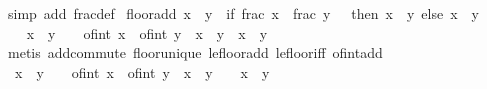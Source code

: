 \begin{isabellebody}
\isamarkupfalse%
\ {\isacharparenleft}{\kern0pt}simp\ add{\isacharcolon}{\kern0pt}\ frac{\isacharunderscore}{\kern0pt}def{\isacharparenright}{\kern0pt}%
\endisatagproof
{\isafoldproof}%
%
\isadelimproof
\isanewline
%
\endisadelimproof
\isanewline
{}\isamarkupfalse%
\ floor{\isacharunderscore}{\kern0pt}add{\isacharcolon}{\kern0pt}\ {\isachardoublequoteopen}{\isasymlfloor}x\ {\isacharplus}{\kern0pt}\ y{\isasymrfloor}\ {\isacharequal}{\kern0pt}\ {\isacharparenleft}{\kern0pt}if\ frac\ x\ {\isacharplus}{\kern0pt}\ frac\ y\ {\isacharless}{\kern0pt}\ {}\ then\ {\isasymlfloor}x{\isasymrfloor}\ {\isacharplus}{\kern0pt}\ {\isasymlfloor}y{\isasymrfloor}\ else\ {\isacharparenleft}{\kern0pt}{\isasymlfloor}x{\isasymrfloor}\ {\isacharplus}{\kern0pt}\ {\isasymlfloor}y{\isasymrfloor}{\isacharparenright}{\kern0pt}\ {\isacharplus}{\kern0pt}\ {}{\isacharparenright}{\kern0pt}{\isachardoublequoteclose}\isanewline
%
\isadelimproof
%
\endisadelimproof
%
\isatagproof
{}\isamarkupfalse%
\ {\isacharminus}{\kern0pt}\isanewline
\ \ \isamarkupfalse%
\ {\isachardoublequoteopen}x\ {\isacharplus}{\kern0pt}\ y\ {\isacharless}{\kern0pt}\ {}\ {\isacharplus}{\kern0pt}\ {\isacharparenleft}{\kern0pt}of{\isacharunderscore}{\kern0pt}int\ {\isasymlfloor}x{\isasymrfloor}\ {\isacharplus}{\kern0pt}\ of{\isacharunderscore}{\kern0pt}int\ {\isasymlfloor}y{\isasymrfloor}{\isacharparenright}{\kern0pt}\ {\isasymLongrightarrow}\ {\isasymlfloor}x\ {\isacharplus}{\kern0pt}\ y{\isasymrfloor}\ {\isacharequal}{\kern0pt}\ {\isasymlfloor}x{\isasymrfloor}\ {\isacharplus}{\kern0pt}\ {\isasymlfloor}y{\isasymrfloor}{\isachardoublequoteclose}\isanewline
\ \ \ \ \isamarkupfalse%
\ {\isacharparenleft}{\kern0pt}metis\ add{\isachardot}{\kern0pt}commute\ floor{\isacharunderscore}{\kern0pt}unique\ le{\isacharunderscore}{\kern0pt}floor{\isacharunderscore}{\kern0pt}add\ le{\isacharunderscore}{\kern0pt}floor{\isacharunderscore}{\kern0pt}iff\ of{\isacharunderscore}{\kern0pt}int{\isacharunderscore}{\kern0pt}add{\isacharparenright}{\kern0pt}\isanewline
\ \ \isamarkupfalse%
\isanewline
\ \ \isamarkupfalse%
\ {\isachardoublequoteopen}{\isasymnot}\ x\ {\isacharplus}{\kern0pt}\ y\ {\isacharless}{\kern0pt}\ {}\ {\isacharplus}{\kern0pt}\ {\isacharparenleft}{\kern0pt}of{\isacharunderscore}{\kern0pt}int\ {\isasymlfloor}x{\isasymrfloor}\ {\isacharplus}{\kern0pt}\ of{\isacharunderscore}{\kern0pt}int\ {\isasymlfloor}y{\isasymrfloor}{\isacharparenright}{\kern0pt}\ {\isasymLongrightarrow}\ {\isasymlfloor}x\ {\isacharplus}{\kern0pt}\ y{\isasymrfloor}\ {\isacharequal}{\kern0pt}\ {}\ {\isacharplus}{\kern0pt}\ {\isacharparenleft}{\kern0pt}{\isasymlfloor}x{\isasymrfloor}\ {\isacharplus}{\kern0pt}\ {\isasymlfloor}y{\isasymrfloor}{\isacharparenright}{\kern0pt}{\isachardoublequoteclose}\isanewline

\end{isabellebody}
